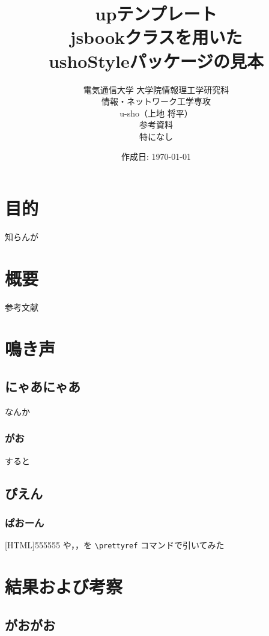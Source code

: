 \documentclass[uplatex,dvipdfmx,11pt]{jsbook}
\title{
  {\normalsize up\LaTeXe テンプレート}%
  \\[10truemm]
  jsbookクラスを用いた\\
  ushoStyleパッケージの見本
  \vspace{30truemm}
}
\author{
  \large{電気通信大学 大学院情報理工学研究科}\\
  \large{情報・ネットワーク工学専攻}
  \\[10truemm]
  u-sho（上地 将平）
  \\[20truemm]
  参考資料
  \\[5truemm]
  特になし
  \vspace{20truemm}
}
\date{作成日: \和暦\today}
\begin{document}
  \maketitle
  \tableofcontents

  \chapter{目的}%
    知らんが

  \chapter{概要}%
    参考文献~\cite{キー1}

  \chapter{鳴き声} %

    \section{にゃあにゃあ}
      なんか

      \subsection{がお}
        すると

    \section{ぴえん} %

      \subsection{ぱおーん}

        [HTML]{555555}{}
        や，，を \verb|\prettyref| コマンドで引いてみた

  \newpage

  \chapter{結果および考察}

    \section{がおがお}
\end{document}

